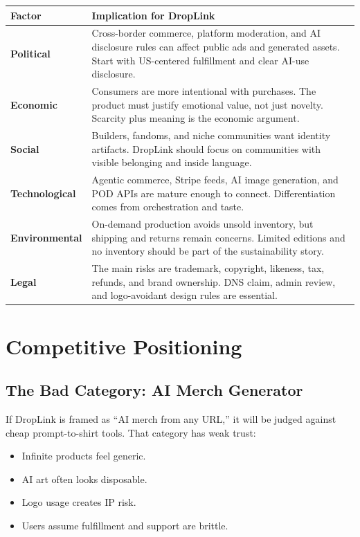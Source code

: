 \documentclass[11pt]{article}
\begin{document}
\begin{longtable}{p{}p{}}
\toprule
\textbf{Factor} & \textbf{Implication for DropLink} \\
\midrule
\endhead
\textbf{Political} & Cross-border commerce, platform moderation, and AI disclosure rules can affect public ads and generated assets. Start with US-centered fulfillment and clear AI-use disclosure. \\
\textbf{Economic} & Consumers are more intentional with purchases. The product must justify emotional value, not just novelty. Scarcity plus meaning is the economic argument. \\
\textbf{Social} & Builders, fandoms, and niche communities want identity artifacts. DropLink should focus on communities with visible belonging and inside language. \\
\textbf{Technological} & Agentic commerce, Stripe feeds, AI image generation, and POD APIs are mature enough to connect. Differentiation comes from orchestration and taste. \\
\textbf{Environmental} & On-demand production avoids unsold inventory, but shipping and returns remain concerns. Limited editions and no inventory should be part of the sustainability story. \\
\textbf{Legal} & The main risks are trademark, copyright, likeness, tax, refunds, and brand ownership. DNS claim, admin review, and logo-avoidant design rules are essential. \\
\bottomrule
\end{longtable}

\section{Competitive Positioning}

\subsection{The Bad Category: AI Merch Generator}

If DropLink is framed as ``AI merch from any URL,'' it will be judged against cheap prompt-to-shirt tools. That category has weak trust:

\begin{itemize}
  \item Infinite products feel generic.
  \item AI art often looks disposable.
  \item Logo usage creates IP risk.
  \item Users assume fulfillment and support are brittle.
\end{itemize}
\end{document}
